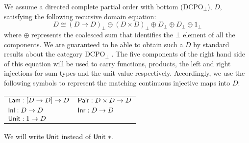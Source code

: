 We assume a directed complete partial order with bottom
($\mathrm{DCPO}_\bot$), $D$, satisfying the following recursive domain
equation:
\begin{displaymath}
  D \cong (D \to D)_\bot \oplus (D \times D)_\bot \oplus D_\bot \oplus D_\bot \oplus 1_\bot
\end{displaymath}
where $\oplus$ represents the coalesced sum that identifies the $\bot$
element of all the components. We are guaranteed to be able to obtain
such a $D$ by standard results about the category $\mathrm{DCPO}_\bot$
\cite{smythplotkin}. The five components of the right hand side of
this equation will be used to carry functions, products, the left and
right injections for sum types and the unit value
respectively. Accordingly, we use the following symbols to represent
the matching continuous injective maps into $D$:
\begin{center}
  \begin{tabular}{ll}
    $\mathsf{Lam} : [D \to D] \to D$ & $\mathsf{Pair} : D \times D \to D$ \\
    $\mathsf{Inl} : D \to D$ & $\mathsf{Inr} : D \to D$ \\
    $\mathsf{Unit} : 1 \to D$
  \end{tabular}  
\end{center}
We will write $\mathsf{Unit}$ instead of $\mathsf{Unit}\ *$.


